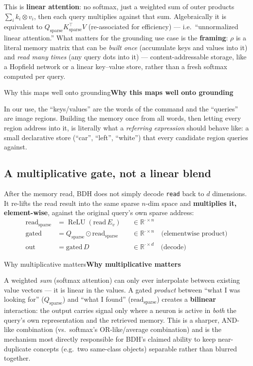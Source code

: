 \documentclass[11pt]{article}
\newlength{\boxinnerwidth}
\newenvironment{keybox}[1][]{%
  \def\tmptitle{#1}%
  \setlength{\boxinnerwidth}{\dimexpr\linewidth-2\fboxsep-2\fboxrule\relax}%
  \begin{lrbox}{\keyboxbin}
  \begin{minipage}{\boxinnerwidth}
  \ifx\tmptitle\empty\else\noindent\textbf{\tmptitle}\par\smallskip\fi
}{%
  \end{minipage}
  \end{lrbox}%
  \par\addvspace{8pt}\noindent\fcolorbox{blue!35!black}{blue!4}{\usebox{\keyboxbin}}\par\addvspace{8pt}%
}
\newcommand{\R}{\mathbb{R}}
\begin{document}
This is \textbf{linear attention}: no softmax, just a weighted sum of outer products
$\sum_i k_i \otimes v_i$, then each query multiplies against that sum. Algebraically
it is equivalent to $Q_{\text{sparse}}K_{\text{sparse}}^{\top}V$ (re-associated for
efficiency) --- i.e.\ ``unnormalized linear attention.'' What matters for the
grounding use case is the \textbf{framing}: $\rho$ is a literal memory matrix that
can be \emph{built once} (accumulate keys and values into it) and \emph{read many
times} (any query dots into it) --- content-addressable storage, like a Hopfield
network or a linear key--value store, rather than a fresh softmax computed per
query.

\begin{keybox}[Why this maps well onto grounding]
In our use, the ``keys/values'' are the words of the command and the ``queries''
are image regions. Building the memory once from all words, then letting every
region address into it, is literally what a \emph{referring expression} should
behave like: a small declarative store (``car'', ``left'', ``white'') that every
candidate region queries against.
\end{keybox}

\subsection{A multiplicative gate, not a linear blend}

After the memory read, BDH does not simply decode \texttt{read} back to $d$
dimensions. It re-lifts the read result into the same sparse $n$-dim space and
\textbf{multiplies it, element-wise}, against the original query's own sparse
address:
\begin{align}
  \text{read}_{\text{sparse}} &= \operatorname{ReLU}(\text{read}\,E_v) && \in \R^{\cdot \times n} \\
  \text{gated} &= Q_{\text{sparse}} \odot \text{read}_{\text{sparse}} && \in \R^{\cdot \times n} \quad \text{(elementwise product)} \\
  \text{out} &= \text{gated}\,D && \in \R^{\cdot \times d} \quad \text{(decode)}
\end{align}

\begin{keybox}[Why multiplicative matters]
A weighted \emph{sum} (softmax attention) can only ever interpolate between
existing value vectors --- it is linear in the values. A gated \emph{product}
between ``what I was looking for'' ($Q_{\text{sparse}}$) and ``what I found''
($\text{read}_{\text{sparse}}$) creates a \textbf{bilinear} interaction: the output
carries signal only where a neuron is active in \emph{both} the query's own
representation and the retrieved memory. This is a sharper, AND-like combination
(vs.\ softmax's OR-like/average combination) and is the mechanism most directly
responsible for BDH's claimed ability to keep near-duplicate concepts (e.g.\ two
same-class objects) separable rather than blurred together.
\end{keybox}
\end{document}
